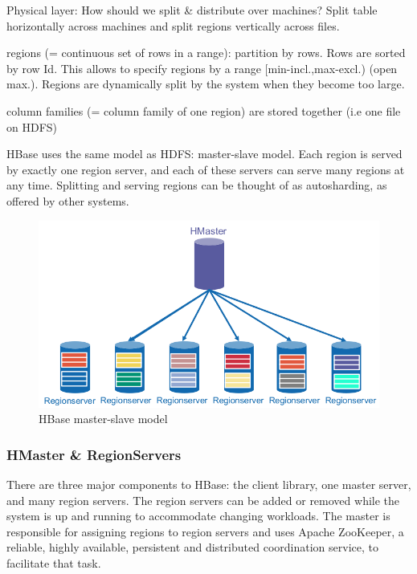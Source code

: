 \documentclass[11pt,oneside,a4paper]{article}
\begin{document}
Physical layer: How should we split \& distribute over machines? Split table horizontally across machines and split regions vertically across files.
\begin{compactitem}
	\item regions (= continuous set of rows in a range): partition by rows. Rows are sorted by row Id. This allows to specify regions by a range [min-incl.,max-excl.) (open max.). Regions are dynamically split by the system when they become too large.
	\item column families (= column family of one region) are stored together (i.e one file on HDFS)\\
\end{compactitem}

HBase uses the same model as HDFS: master-slave model. Each region is served by exactly one region server, and each of these servers can serve many regions at any time. Splitting and serving regions can be thought of as autosharding, as offered by other systems.

\begin{figure}[hb!]
	\centering
	\includegraphics[width=0.4\linewidth]{figures/hbase_master_slave}
	\caption{HBase master-slave model}
	\label{fig:hbasemasterslave}
\end{figure}

\subsubsection{HMaster \& RegionServers}

There are three major components to HBase: the client library, one master server, and many region servers. The region servers can be added or removed while the system is up and running to accommodate changing workloads. The master is responsible for assigning regions to region servers and uses Apache ZooKeeper, a reliable, highly available, persistent and distributed coordination service, to facilitate that task.
\end{document}
